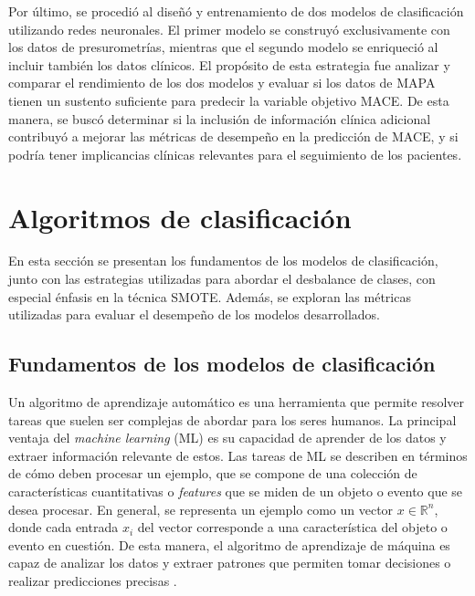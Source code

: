 Por último, se procedió al diseñó y entrenamiento de dos modelos de clasificación utilizando 
redes neuronales. El primer modelo se construyó exclusivamente con los datos de presurometrías, 
mientras que el segundo modelo se enriqueció al incluir también los datos clínicos. El propósito 
de esta estrategia fue analizar y comparar el rendimiento de los dos modelos y evaluar si los 
datos de MAPA tienen un sustento suficiente para predecir la variable objetivo MACE. De esta 
manera, se buscó determinar si la inclusión de información clínica adicional contribuyó a 
mejorar las métricas de desempeño en la predicción de MACE, y si podría tener implicancias 
clínicas relevantes para el seguimiento de los pacientes.

\section{Algoritmos de clasificación}
\label{sec:Algoritmos de clasificación}

En esta sección se presentan los fundamentos de los modelos de clasificación, junto con las 
estrategias utilizadas para abordar el desbalance de clases, con especial énfasis en la técnica SMOTE. 
Además, se exploran las métricas utilizadas para evaluar el desempeño de los modelos desarrollados.


\subsection{Fundamentos de los modelos de clasificación}
Un algoritmo de aprendizaje automático es una herramienta que permite resolver tareas  
que suelen ser complejas de abordar para los seres humanos. La principal ventaja del \emph{machine 
learning} (ML) es su capacidad de aprender de los datos y extraer información relevante de 
estos. Las tareas de ML se describen en términos de cómo deben procesar un ejemplo, que se 
compone de una colección de características cuantitativas o \emph{features} que se miden de un objeto 
o evento que se desea procesar. En general, se representa un ejemplo como un vector $ x\in\mathbb{R}^n $,
donde cada entrada $x_{i}$ del vector corresponde a una característica del objeto 
o evento en cuestión. De esta manera, el algoritmo de aprendizaje de máquina es capaz de 
analizar los datos y extraer patrones que permiten tomar decisiones o realizar predicciones 
precisas \citep{CITE:35}.

